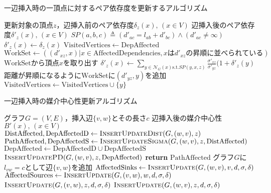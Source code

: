 \begin{algorithm}[H]
  \caption{一辺挿入時の一頂点に対するペア依存度を更新するアルゴリズム}
  \label{algo:update-pd-on-insert}
  \begin{algorithmic}[1]
    \Require 更新対象の頂点$z$，辺挿入前のペア依存度$\delta_z(x),\,(x\in V)$
    \Ensure 辺挿入後のペア依存度$\delta'_z(x),\,(x\in V)$
    \State $SP(a,b,c)\triangleq(d'_{ac}=l_{ab}+d'_{bc})\land(d'_{ac}\neq\infty)$
    \State $\delta'_z(x)\gets\delta_z(x)$
    \State $\mathrm{VisitedVertices}\gets\mathrm{DepAffected}$
    \State $\mathrm{WorkSet}\gets((d'_{xz},x)|x\in\mathrm{AffectedDependencies},x\mathrm{は}d'_{xz}\mathrm{の昇順に並べられている})$
    \State $\mathrm{WorkSet}$から頂点$x$を取り出す
    \State $\delta'_z(x)\gets\sum_{y\in\mathcal{N}_G(x)\mathrm{s.t.}SP(y,x,z)}\frac{\sigma'_{xz}}{\sigma'_{yz}}(1+\delta'_z(y)$
    \State 距離が昇順になるように$\mathrm{WorkSet}$に$(d'_{yz},y)$を追加
    \State $\mathrm{VisitedVertices}\gets\mathrm{VisitedVertices}\cup\{y\}$
    \EndFor
    \EndIf
    \EndWhile
    \EndProcedure
  \end{algorithmic}
\end{algorithm}

\begin{algorithm}[H]
  \caption{一辺挿入時の媒介中心性更新アルゴリズム}
  \label{algo:update-bc-on-insert}
  \begin{algorithmic}[1]
    \Require グラフ$G=(V,E)$，挿入辺$\{v,w\}$とその長さ$c$
    \Ensure 辺挿入後の媒介中心性$B'(x),\,(x\in V)$
    \State $\mathrm{DistAffected},\mathrm{DepAffectedD}\gets\textproc{InsertUpdateDist}(G,(w,v),z)$
    \State $\mathrm{PathAffected},\mathrm{DepAffectedS}\gets\textproc{InsertUpdateSigma}(G,(w,v),z,\mathrm{DistAffected})$
    \State $\mathrm{DepAffected}\gets\mathrm{DepAffectedD}\cup\mathrm{DepAffectedS}$
    \State $\textproc{InsertUpdatePD}(G,(w,v),z,\mathrm{DepAffected})$
    \State \textbf{return} $\mathrm{PathAffected}$
    \EndProcedure
    \State グラフ$G$に$l_{vw}=c$として辺$\{v,w\}$を追加
    \State $\mathrm{AffectedSinks}\gets\textproc{InsertUpdate}(G,(w,v),v,d,\sigma,\delta)$
    \State $\mathrm{AffectedSources}\gets\textproc{InsertUpdate}(G,(v,w),w,d,\sigma,\delta)$
    \State $\textproc{InsertUpdate}(G,(v,w),z,d,\sigma,\delta)$
    \EndFor
    \State $\textproc{InsertUpdate}(G,(w,v),z,d,\sigma,\delta)$
    \EndFor
  \end{algorithmic}
\end{algorithm}

